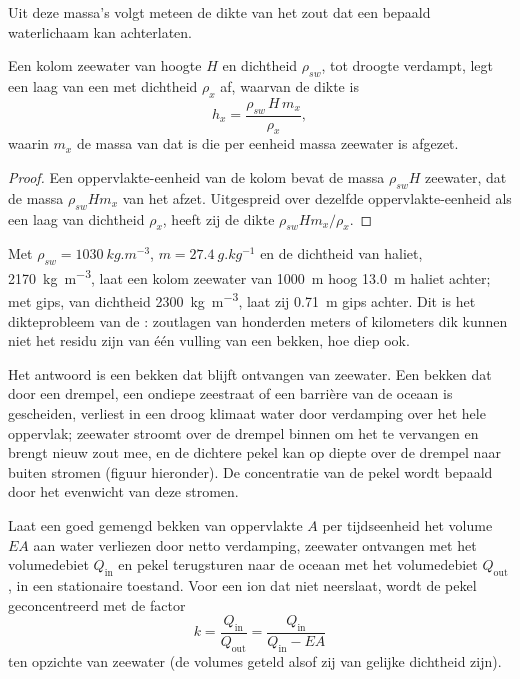Uit deze massa's volgt meteen de dikte van het zout dat een bepaald waterlichaam kan achterlaten.

\begin{proposition}\label{prop:b1:chemical-biogenic-sediments:column}
Een kolom zeewater van hoogte $H$ en dichtheid $\rho_{sw}$, tot droogte verdampt, legt een laag van een  met dichtheid $\rho_x$ af, waarvan de dikte is
\[
h_x = \frac{\rho_{sw}\,H\,m_x}{\rho_x},
\]
waarin $m_x$ de massa van dat  is die per eenheid massa zeewater is afgezet.
\end{proposition}

\begin{proof}
Een oppervlakte-eenheid van de kolom bevat de massa $\rho_{sw}H$ zeewater, dat de massa $\rho_{sw}Hm_x$ van het  afzet. Uitgespreid over dezelfde oppervlakte-eenheid als een laag van dichtheid $\rho_x$, heeft zij de dikte $\rho_{sw}Hm_x/\rho_x$.
\end{proof}

Met $\rho_{sw} = \qty{1030}{kg.m^{-3}}$, $m = \qty{27.4}{g.kg^{-1}}$ en de dichtheid van haliet, \qty{2170}{kg.m^{-3}}, laat een kolom zeewater van \qty{1000}{m} hoog \qty{13.0}{m} haliet achter; met gips, van dichtheid \qty{2300}{kg.m^{-3}}, laat zij \qty{0.71}{m} gips achter. Dit is het dikteprobleem van de : zoutlagen van honderden meters of kilometers dik kunnen niet het residu zijn van één vulling van een bekken, hoe diep ook.

Het antwoord is een bekken dat blijft ontvangen van zeewater. Een bekken dat door een drempel, een ondiepe zeestraat of een barrière van de oceaan is gescheiden, verliest in een droog klimaat water door verdamping over het hele oppervlak; zeewater stroomt over de drempel binnen om het te vervangen en brengt nieuw zout mee, en de dichtere pekel kan op diepte over de drempel naar buiten stromen (figuur hieronder). De concentratie van de pekel wordt bepaald door het evenwicht van deze stromen.

\begin{proposition}\label{prop:b1:chemical-biogenic-sediments:barred}
Laat een goed gemengd bekken van oppervlakte $A$ per tijdseenheid het volume $EA$ aan water verliezen door netto verdamping, zeewater ontvangen met het volumedebiet $Q_{\mathrm{in}}$ en pekel terugsturen naar de oceaan met het volumedebiet $Q_{\mathrm{out}}$, in een stationaire toestand. Voor een ion dat niet neerslaat, wordt de pekel geconcentreerd met de factor
\[
k = \frac{Q_{\mathrm{in}}}{Q_{\mathrm{out}}} = \frac{Q_{\mathrm{in}}}{Q_{\mathrm{in}} - EA}
\]
ten opzichte van zeewater (de volumes geteld alsof zij van gelijke dichtheid zijn).
\end{proposition}

